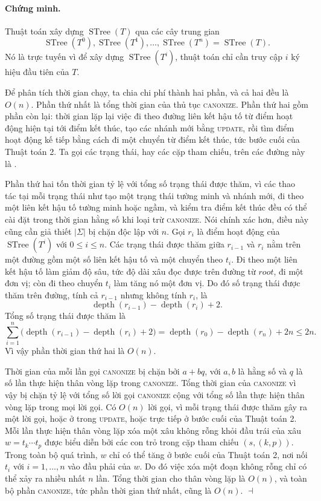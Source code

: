 \documentclass[11pt]{article}
\newenvironment{proof}{\paragraph{Chứng minh.}}{\hfill$\dashv$\par}
\newcommand{\STree}{\operatorname{STree}}
\begin{document}
\begin{proof}
Thuật toán xây dựng $\STree(T)$ qua các cây trung gian
\[
  \STree(T^0),\STree(T^1),\ldots,\STree(T^n)=\STree(T).
\]
Nó là trực tuyến vì để xây dựng $\STree(T^i)$, thuật toán chỉ cần truy cập
$i$ ký hiệu đầu tiên của $T$.

Để phân tích thời gian chạy, ta chia chi phí thành hai phần, và cả hai đều là
$O(n)$. Phần thứ nhất là tổng thời gian của thủ tục \textsc{canonize}. Phần
thứ hai gồm phần còn lại: thời gian lặp lại việc đi theo đường liên kết hậu tố
từ điểm hoạt động hiện tại tới điểm kết thúc, tạo các nhánh mới bằng
\textsc{update}, rồi tìm điểm hoạt động kế tiếp bằng cách đi một chuyển từ
điểm kết thúc, tức bước cuối của Thuật toán 2. Ta gọi các trạng thái, hay các
cặp tham chiếu, trên các đường này là .

Phần thứ hai tốn thời gian tỷ lệ với tổng số trạng thái được thăm, vì các thao
tác tại mỗi trạng thái như tạo một trạng thái tường minh và nhánh mới, đi theo
một liên kết hậu tố tường minh hoặc ngầm, và kiểm tra điểm kết thúc đều có thể
cài đặt trong thời gian hằng số khi loại trừ \textsc{canonize}. Nói chính xác
hơn, điều này cũng cần giả thiết $|\Sigma|$ bị chặn độc lập với $n$. Gọi
$r_i$ là điểm hoạt động của $\STree(T^i)$ với $0\le i\le n$. Các trạng thái
được thăm giữa $r_{i-1}$ và $r_i$ nằm trên một đường gồm một số liên kết hậu
tố và một chuyển theo $t_i$. Đi theo một liên kết hậu tố làm giảm độ sâu, tức
độ dài xâu đọc được trên đường từ $\mathit{root}$, đi một đơn vị; còn đi theo
chuyển $t_i$ làm tăng nó một đơn vị. Do đó số trạng thái được thăm trên đường,
tính cả $r_{i-1}$ nhưng không tính $r_i$, là
\[
  \operatorname{depth}(r_{i-1})-\operatorname{depth}(r_i)+2.
\]
Tổng số trạng thái được thăm là
\[
  \sum_{i=1}^n
  \bigl(\operatorname{depth}(r_{i-1})-\operatorname{depth}(r_i)+2\bigr)
  =\operatorname{depth}(r_0)-\operatorname{depth}(r_n)+2n\le 2n.
\]
Vì vậy phần thời gian thứ hai là $O(n)$.

Thời gian của mỗi lần gọi \textsc{canonize} bị chặn bởi $a+bq$, với $a,b$ là
hằng số và $q$ là số lần thực hiện thân vòng lặp trong \textsc{canonize}. Tổng
thời gian của \textsc{canonize} vì vậy bị chặn tỷ lệ với tổng số lời gọi
\textsc{canonize} cộng với tổng số lần thực hiện thân vòng lặp trong mọi lời
gọi. Có $O(n)$ lời gọi, vì mỗi trạng thái được thăm gây ra một lời gọi, hoặc
ở trong \textsc{update}, hoặc trực tiếp ở bước cuối của Thuật toán 2. Mỗi lần
thực hiện thân vòng lặp xóa một xâu không rỗng khỏi đầu trái của xâu
$w=t_k\cdots t_p$ được biểu diễn bởi các con trỏ trong cặp tham chiếu
$(s,(k,p))$. Trong toàn bộ quá trình, $w$ chỉ có thể tăng ở bước cuối của
Thuật toán 2, nơi nối $t_i$ với $i=1,\ldots,n$ vào đầu phải của $w$. Do đó
việc xóa một đoạn không rỗng chỉ có thể xảy ra nhiều nhất $n$ lần. Tổng thời
gian cho thân vòng lặp là $O(n)$, và toàn bộ phần \textsc{canonize}, tức phần
thời gian thứ nhất, cũng là $O(n)$.
\end{proof}
\end{document}
